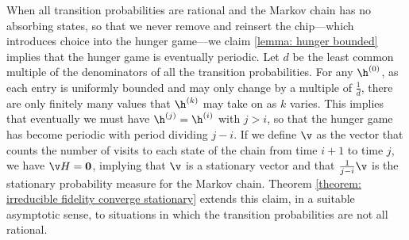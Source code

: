 \begin{remark}\label{remark: finite orbit}
When all transition probabilities are rational
and the Markov chain has no absorbing states,
so that we never remove and reinsert the chip---which
introduces choice into the hunger game---we claim \cref{lemma: hunger bounded}
implies that the hunger game is eventually periodic.
Let $d$ be the least common multiple
of the denominators of all the transition probabilities.
For any $\h^{(0)}$, as each entry is uniformly bounded and may only
change by a multiple of $\frac{1}{d}$, there are only finitely
many values that $\h^{(k)}$ may take on as $k$ varies.
This implies that eventually we must have $\h^{(j)} = \h^{(i)}$ with $j > i$,
so that the hunger game has become periodic with period dividing $j-i$.
If we define $\v$ as the vector that counts
the number of visits to each state of the chain from time $i+1$ to time $j$,
we have $\v H = {\bf 0}$, implying that $\v$ is a stationary vector
and that $\frac{1}{j-i}\v$ is the stationary probability measure for the Markov chain.
Theorem \ref{theorem: irreducible fidelity converge stationary}
extends this claim, in a suitable asymptotic sense,
to situations in which the transition probabilities
are not all rational.
\end{remark}

